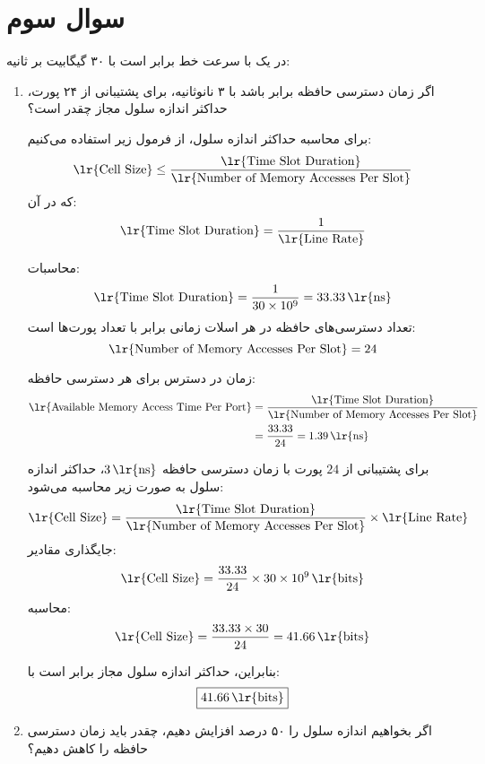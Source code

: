 \section{سوال سوم}

در یک  با سرعت خط برابر است با ۳۰ گیگابیت بر ثانیه:

\begin{enumerate}
	\item 
	اگر زمان دسترسی حافظه برابر باشد با ۳ نانوثانیه، برای پشتیبانی از ۲۴ پورت، حداکثر اندازه سلول مجاز چقدر است؟
	
	\begin{qsolve}
		    برای محاسبه حداکثر اندازه سلول، از فرمول زیر استفاده می‌کنیم:
		\[
		\text{\lr{Cell Size}} \leq \frac{\text{\lr{Time Slot Duration}}}{\text{\lr{Number of Memory Accesses Per Slot}}}
		\]
		که در آن:
		\[
		\text{\lr{Time Slot Duration}} = \frac{1}{\text{\lr{Line Rate}}}
		\]
		
		محاسبات:
		\[
		\text{\lr{Time Slot Duration}} = \frac{1}{30 \times 10^9} = 33.33 \, \text{\lr{ns}}
		\]
		تعداد دسترسی‌های حافظه در هر اسلات زمانی برابر با تعداد پورت‌ها است:
		\[
		\text{\lr{Number of Memory Accesses Per Slot}} = 24
		\]
		
		زمان در دسترس برای هر دسترسی حافظه:
		\[
		\begin{aligned}
			\text{\lr{Available Memory Access Time Per Port}} &= \frac{\text{\lr{Time Slot Duration}}}{\text{\lr{Number of Memory Accesses Per Slot}}} \\
			&= \frac{33.33}{24} = 1.39 \, \text{\lr{ns}}
		\end{aligned}
		\]
		
		برای پشتیبانی از \(24\) پورت با زمان دسترسی حافظه \(3 \, \text{\lr{ns}}\)، حداکثر اندازه سلول به صورت زیر محاسبه می‌شود:
		\[
		\text{\lr{Cell Size}} = \frac{\text{\lr{Time Slot Duration}}}{\text{\lr{Number of Memory Accesses Per Slot}}} \times \text{\lr{Line Rate}}
		\]
		جایگذاری مقادیر:
		\[
		\text{\lr{Cell Size}} = \frac{33.33}{24} \times 30 \times 10^9 \, \text{\lr{bits}}
		\]
		محاسبه:
		\[
		\text{\lr{Cell Size}} = \frac{33.33 \times 30}{24} = 41.66 \, \text{\lr{bits}}
		\]
		
		بنابراین، حداکثر اندازه سلول مجاز برابر است با:
		\[
		\boxed{41.66 \, \text{\lr{bits}}}
		\]
		
	\end{qsolve}
	
	\item 
	اگر بخواهیم اندازه سلول را ۵۰ درصد افزایش دهیم، چقدر باید زمان دسترسی حافظه را کاهش دهیم؟
\end{enumerate}
\newpage

